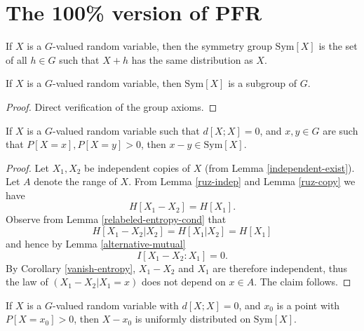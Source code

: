 \chapter{The 100\% version of PFR}

\begin{definition}\label{sym-group-def}
\leanok
If $X$ is a $G$-valued random variable, then the symmetry group $\mathrm{Sym}[X]$ is the set of all $h \in G$ such that $X+h$ has the same distribution as $X$.
\end{definition}

\begin{lemma}\label{sym-group}
\leanok
If $X$ is a $G$-valued random variable, then $\mathrm{Sym}[X]$ is a subgroup of $G$.
\end{lemma}

\begin{proof}\leanok Direct verification of the group axioms.
\end{proof}

\begin{lemma}\label{zero-large}
  \leanok  If $X$ is a $G$-valued random variable such that
  $d[X;X]=0$, and $x,y \in G$ are such that $P[X=x], P[X=y]>0$, then $x-y \in \mathrm{Sym}[X]$.
\end{lemma}

\begin{proof}
  \leanok
   Let $X_1,X_2$ be independent copies of $X$ (from Lemma \ref{independent-exist}). Let $A$ denote the range of $X$.  From Lemma \ref{ruz-indep} and Lemma \ref{ruz-copy} we have
  $$ H[X_1-X_2] = H[X_1].$$
Observe from Lemma \ref{relabeled-entropy-cond} that
$$ H[X_1-X_2|X_2] = H[X_1|X_2] = H[X_1]$$
and hence by Lemma \ref{alternative-mutual}
$$ I[ X_1-X_2 : X_1 ] = 0.$$
By Corollary \ref{vanish-entropy}, $X_1-X_2$ and $X_1$ are therefore independent, thus the law of $(X_1-X_2|X_1=x)$ does not depend on $x \in A$. The claim follows.
\end{proof}

\begin{lemma}\label{sym-zero}
  If $X$ is a $G$-valued random variable with $d[X;X]=0$, and $x_0$ is a point with $P[X=x_0] > 0$, then $X-x_0$ is uniformly distributed on $\mathrm{Sym}[X]$.
\end{lemma}

